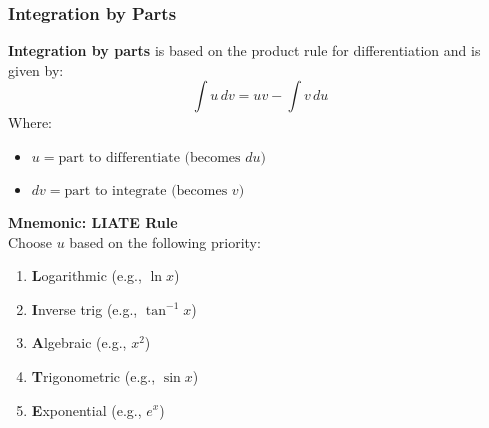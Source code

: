 \documentclass[11pt]{article}
\begin{document}
\subsubsection{Integration by Parts}
\textbf{Integration by parts} is based on the product rule for differentiation and is given by:
\[
    \boxed{
        \int u \, dv = uv - \int v \, du
    }
\]Where:
\begin{itemize}
    \item $u = \text{part to differentiate (becomes } du)$
    \item $dv = \text{part to integrate (becomes } v)$
\end{itemize}\textbf{Mnemonic: LIATE Rule}\\
\noindent Choose $u$ based on the following priority:
\begin{enumerate}
    \item \textbf{L}ogarithmic (e.g., $\ln x$)
    \item \textbf{I}nverse trig (e.g., $\tan^{-1} x$)
    \item \textbf{A}lgebraic (e.g., $x^2$)
    \item \textbf{T}rigonometric (e.g., $\sin x$)
    \item \textbf{E}xponential (e.g., $e^x$)
\end{enumerate}
\end{document}
